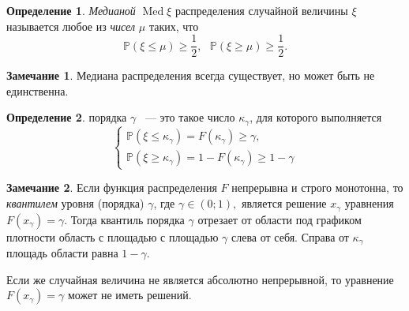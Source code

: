 \documentclass[oneside,final,14pt]{extreport}
\newcommand\myprob[1]{{\mathbb{P}(#1)}}
\theoremstyle{plain}
\theoremstyle{definition}
\newtheorem*{defn}{Определение}
\newtheorem*{rmrk}{Замечание}
\theoremstyle{named}
\begin{document}
\begin{defn}
    {\it Медианой} $\operatorname{Med} \xi$ распределения случайной величины $\xi$ называется любое из {\it чисел} $\mu$ таких, что
    \begin{equation*}
        \myprob{\xi \leqslant \mu} \geqslant \frac{1}{2}, ~~~ \myprob{\xi \geqslant \mu} \geqslant \frac{1}{2}.
    \end{equation*}
\end{defn} 

\begin{rmrk}
    Медиана распределения всегда существует, но может быть не единственна.
\end{rmrk} 

\begin{defn}
{  порядка $\gamma$} ~--- это такое число $\kappa_\gamma$, для которого выполняется 
$$ \begin{cases} \myprob{\xi \leqslant \kappa_\gamma} = F(\kappa_\gamma) \geqslant \gamma, \\
\myprob{\xi \geqslant \kappa_\gamma} = 1 - F(\kappa_\gamma) \geqslant 1 - \gamma \end{cases}
$$
\end{defn}

\begin{rmrk}
    Если функция распределения $F$ непрерывна и строго монотонна, то {\it квантилем} уровня (порядка) $\gamma$, где $\gamma \in (0; 1), $ является решение $x_\gamma$ уравнения $F(x_\gamma) = \gamma.$ 
    Тогда квантиль порядка $\gamma$ отрезает от области под графиком плотности область с площадью с площадью $\gamma$ слева от себя. Справа от $\kappa_\gamma$ площадь области равна $1 - \gamma$.
    
    Если же случайная величина не является абсолютно непрерывной, то уравнение $F(x_\gamma) = \gamma$ может не иметь решений.
        
    \medskip\hfill\break
    \begin{center}
    \end{center}
\end{rmrk} 
\end{document}
